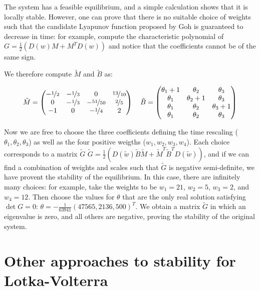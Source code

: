 \documentclass{article}
\begin{document}
The system has a feasible equilibrium, and a simple calculation shows
that it is locally stable. However, one can prove that there is no
suitable choice of weights such that the candidate Lyapunov function
proposed by Goh is guaranteed to decrease in time: for example, compute
the characteristic polynomial of \(G = \frac{1}{2}(D(w) M + M^T D(w))\)
and notice that the coefficients cannot be of the same sign.

We therefore compute \(\tilde{M}\) and \(\tilde{B}\) as:

\begin{equation}
\tilde{M} = \begin{pmatrix}
-\nicefrac{1}{2} & -\nicefrac{1}{3} & 0 & \nicefrac{13}{10}\\
0 &  -\nicefrac{1}{3} &  -\nicefrac{51}{50} & \nicefrac{2}{5}\\
-1 & 0 & -\nicefrac{1}{4} & 2
\end{pmatrix} 
\quad
\tilde{B} = \begin{pmatrix}
\theta_1 + 1 & \theta_2 & \theta_3 \\
\theta_1 & \theta_2 +1 & \theta_3 \\
\theta_1  & \theta_2 & \theta_3 +1 \\
\theta_1 & \theta_2 & \theta_3
\end{pmatrix}
\end{equation}

Now we are free to choose the three coefficients defining the time
rescaling (\(\theta_1, \theta_2, \theta_3\)) as well as the four
positive weigths (\(w_1, w_2, w_3, w_4\)). Each choice corresponds to a
matrix \(\tilde{G}\)
\(\tilde{G} = \frac{1}{2} (D(\tilde{w}) \tilde{B}\tilde{M} + \tilde{M}^T\tilde{B}^T D(\tilde{w}))\),
and if we can find a combination of weights and scales such that
\(\tilde{G}\) is negative semi-definite, we have provent the stability
of the equilibrium. In this case, there are infinitely many choices: for
example, take the weights to be \(w_1 = 21\), \(w_2 = 5\), \(w_3 = 2\),
and \(w_4 = 12\). Then choose the values for \(\theta\) that are the
only real solution satisfying \(\det G = 0\):
\(\theta = -\frac{1}{63941}(47565, 2136, 500)^T\). We obtain a matrix
\(\tilde{G}\) in which an eigenvalue is zero, and all others are
negative, proving the stability of the original system.

\hypertarget{other-approaches-to-stability-for-lotka-volterra}{%
\section{Other approaches to stability for
Lotka-Volterra}\label{other-approaches-to-stability-for-lotka-volterra}}
\end{document}
